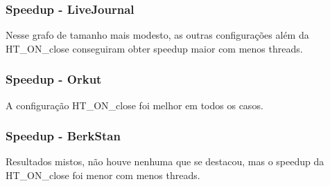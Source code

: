 \documentclass{beamer}
\begin{document}
\begin{frame}
    \frametitle{Speedup - LiveJournal}

    \begin{figure}
        \centering
    \end{figure}
    \centering
    Nesse grafo de tamanho mais modesto, as outras configurações além da HT\_ON\_close conseguiram obter speedup maior com menos threads.
\end{frame}

\begin{frame}
    \frametitle{Speedup - Orkut}

    \begin{figure}
        \centering
    \end{figure}
    \centering
    A configuração HT\_ON\_close foi melhor em todos os casos.
\end{frame}

\begin{frame}
    \frametitle{Speedup - BerkStan}

    \begin{figure}
        \centering
    \end{figure}
    \centering
    Resultados mistos, não houve nenhuma que se destacou, mas o speedup da HT\_ON\_close foi menor com menos threads.
\end{frame}
\end{document}

